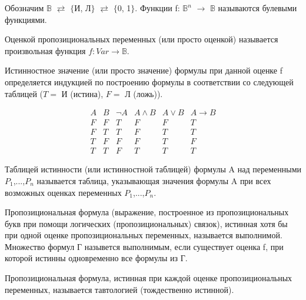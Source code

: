 \begin{definition}
	Обозначим $\mathbb{B}$ $\rightleftarrows$ $\{$И, Л$\}$ $\rightleftarrows$ $\{$0, 1$\}$. Функции f:
	$\mathbb{B}^n$ $\to$ $\mathbb{B}$ называются булевыми функциями.

\end{definition}

\begin{definition}
	Оценкой пропозициональных переменных (или просто оценкой) называется произвольная функция $f: Var \to \mathbb{B}$.
\end{definition}

\begin{definition}
	Истинностное значение (или просто значение) формулы при данной оценке f определяется индукцией по построению
	формулы в соответствии со следующей таблицей ($T =$ И (истина), $F =$ Л (ложь)).

	$$
	\begin{array}{cc|c|c|c|c}
		{A} & {B} & {\neg A} & {A \wedge B} & {A \vee B} & {A \rightarrow B} \\
		\hline F & F & T & F & F & T \\
		F & T & T & F & T & T \\
		T & F & F & F & T & F \\
		T & T & F & T & T & T 
	\end{array}
	$$

\end{definition}

\begin{definition}
	Таблицей истинности (или истинностной таблицей) формулы A над переменными $P_1$,...,$P_n$ называется таблица,
	указывающая значения формулы A при всех возможных оценках переменных $P_1$,...,$P_n$.
\end{definition}

\begin{definition}
	Пропозициональная формула (выражение, построенное из пропозициональных букв при помощи логических
	(пропозициональных) связок), истинная хотя бы при одной оценке пропозициональных переменных, называется
	выполнимой. Множество формул Г назывется выполнимым, если существует оценка f, при которой истинны одновременно
	все формулы из Г.
\end{definition}

\begin{definition}
	Пропозициональная формула, истинная при каждой оценке пропозициональных переменных, называется тавтологией
	(тождественно истинной).
\end{definition}

